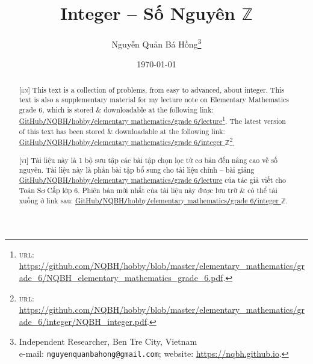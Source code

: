 \documentclass{article}
\title{Integer -- Số Nguyên $\mathbb{Z}$}
\author{Nguyễn Quản Bá Hồng\footnote{Independent Researcher, Ben Tre City, Vietnam\\e-mail: \texttt{nguyenquanbahong@gmail.com}; website: \url{https://nqbh.github.io}.}}
\date{\today}
\numberwithin{equation}{section}
\begin{document}
\maketitle
\begin{abstract}
	\textsc{[en]} This text is a collection of problems, from easy to advanced, about integer. This text is also a supplementary material for my lecture note on Elementary Mathematics grade 6, which is stored \& downloadable at the following link: \href{https://github.com/NQBH/hobby/blob/master/elementary_mathematics/grade_6/NQBH_elementary_mathematics_grade_6.pdf}{GitHub\texttt{/}NQBH\texttt{/}hobby\texttt{/}elementary mathematics\texttt{/}grade 6\texttt{/}lecture}\footnote{\textsc{url}: \url{https://github.com/NQBH/hobby/blob/master/elementary_mathematics/grade_6/NQBH_elementary_mathematics_grade_6.pdf}.}. The latest version of this text has been stored \& downloadable at the following link: \href{https://github.com/NQBH/hobby/blob/master/elementary_mathematics/grade_6/integer/NQBH_integer.pdf}{GitHub\texttt{/}NQBH\texttt{/}hobby\texttt{/}elementary mathematics\texttt{/}grade 6\texttt{/}integer $\mathbb{Z}$}\footnote{\textsc{url}: \url{https://github.com/NQBH/hobby/blob/master/elementary_mathematics/grade_6/integer/NQBH_integer.pdf}.}.
	\vspace{2mm}
	
	\textsc{[vi]} Tài liệu này là 1 bộ sưu tập các bài tập chọn lọc từ cơ bản đến nâng cao về số nguyên. Tài liệu này là phần bài tập bổ sung cho tài liệu chính -- bài giảng \href{https://github.com/NQBH/hobby/blob/master/elementary_mathematics/grade_6/NQBH_elementary_mathematics_grade_6.pdf}{GitHub\texttt{/}NQBH\texttt{/}hobby\texttt{/}elementary mathematics\texttt{/}grade 6\texttt{/}lecture} của tác giả viết cho Toán Sơ Cấp lớp 6. Phiên bản mới nhất của tài liệu này được lưu trữ \& có thể tải xuống ở link sau: \href{https://github.com/NQBH/hobby/blob/master/elementary_mathematics/grade_6/integer/NQBH_integer.pdf}{GitHub\texttt{/}NQBH\texttt{/}hobby\texttt{/}elementary mathematics\texttt{/}grade 6\texttt{/}integer $\mathbb{Z}$}.
\end{abstract}
\tableofcontents

\end{document}
